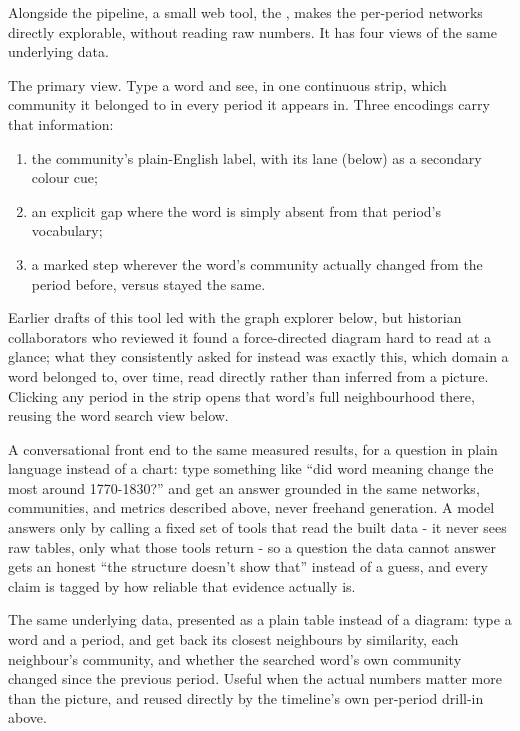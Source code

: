 \documentclass[11pt]{article}
\begin{document}
Alongside the pipeline, a small web tool, the , makes the per-period networks directly explorable, without
reading raw numbers. It has four views of the same underlying data.

 The primary view. Type a word and see, in one
continuous strip, which community it belonged to in every period it
appears in. Three encodings carry that information:

\begin{enumerate}[itemsep=0.15em,label=\arabic*.]
  \item the community's plain-English label, with its lane (below) as a
    secondary colour cue;
  \item an explicit gap where the word is simply absent from that
    period's vocabulary;
  \item a marked step wherever the word's community actually changed
    from the period before, versus stayed the same.
\end{enumerate}

Earlier drafts of this tool led with the graph explorer below,
but historian collaborators who reviewed it found a force-directed
diagram hard to read at a glance; what they consistently asked for
instead was exactly this, which domain a word belonged to, over time,
read directly rather than inferred from a picture. Clicking any period
in the strip opens that word's full neighbourhood there, reusing the
word search view below.

 A conversational front end to the same measured results,
for a question in plain language instead of a chart: type something
like ``did word meaning change the most around 1770-1830?'' and get an
answer grounded in the same networks, communities, and metrics
described above, never freehand generation. A model answers only by
calling a fixed set of tools that read the built data - it never sees
raw tables, only what those tools return - so a question the data
cannot answer gets an honest ``the structure doesn't show that''
instead of a guess, and every claim is tagged by how reliable that
evidence actually is.

 The same underlying data, presented as a plain
table instead of a diagram: type a word and a period, and get back its
closest neighbours by similarity, each neighbour's community, and whether
the searched word's own community changed since the previous period.
Useful when the actual numbers matter more than the picture, and reused
directly by the timeline's own per-period drill-in above.
\end{document}
